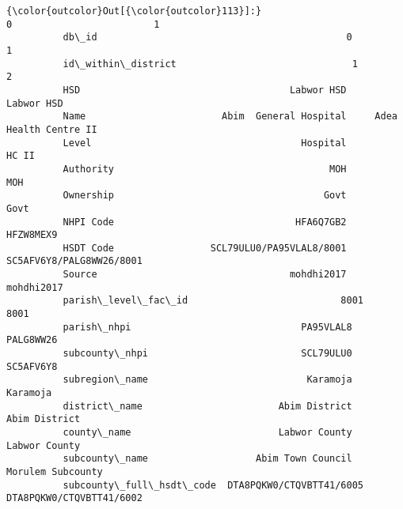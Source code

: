 \documentclass[11pt]{article}
\begin{document}
\begin{Verbatim}[commandchars=\\\{\}]
{\color{outcolor}Out[{\color{outcolor}113}]:}                                                  0                         1
          db\_id                                            0                         1
          id\_within\_district                               1                         2
          HSD                                     Labwor HSD                Labwor HSD
          Name                        Abim  General Hospital     Adea Health Centre II
          Level                                     Hospital                     HC II
          Authority                                      MOH                       MOH
          Ownership                                     Govt                      Govt
          NHPI Code                                HFA6Q7GB2                 HFZW8MEX9
          HSDT Code                 SCL79ULU0/PA95VLAL8/8001  SC5AFV6Y8/PALG8WW26/8001
          Source                                  mohdhi2017                mohdhi2017
          parish\_level\_fac\_id                           8001                      8001
          parish\_nhpi                              PA95VLAL8                 PALG8WW26
          subcounty\_nhpi                           SCL79ULU0                 SC5AFV6Y8
          subregion\_name                            Karamoja                  Karamoja
          district\_name                        Abim District             Abim District
          county\_name                          Labwor County             Labwor County
          subcounty\_name                   Abim Town Council         Morulem Subcounty
          subcounty\_full\_hsdt\_code  DTA8PQKW0/CTQVBTT41/6005  DTA8PQKW0/CTQVBTT41/6002
\end{Verbatim}
            

    
    
    
    
\end{document}
